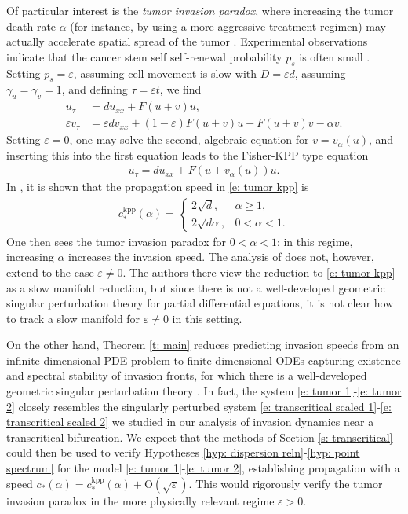 \documentclass[11pt]{article}
\newcommand{\eps}{\varepsilon}
\numberwithin{equation}{section}
\numberwithin{prop}{section}
\begin{document}
Of particular interest is the \emph{tumor invasion paradox}, where increasing the tumor death rate $\alpha$ (for instance, by using a more aggressive treatment regimen) may actually accelerate spatial spread of the tumor \cite{Tumor2}. Experimental observations indicate that the cancer stem self self-renewal probability $p_s$ is often small \cite{Tumor2}. Setting $p_s = \eps$, assuming cell movement is slow with $D = \eps d$, assuming $\gamma_u = \gamma_v = 1$, and defining $\tau = \eps t$, we find 
\begin{align}
u_\tau &= d u_{xx} + F(u+v) u, \label{e: tumor 1}\\
\eps v_\tau &= \eps d v_{xx} + (1-\eps) F(u+v) u + F(u+v) v - \alpha v. \label{e: tumor 2}
\end{align}
Setting $\eps = 0$, one may solve the second, algebraic equation for $v = v_\alpha (u)$, and inserting this into the first equation leads \cite{Tumor2} to the Fisher-KPP type equation
\begin{align}
u_\tau = d u_{xx} + F(u +v_\alpha(u)) u. \label{e: tumor kpp}
\end{align}
In \cite{Tumor1}, it is shown that the propagation speed in \eqref{e: tumor kpp} is
\begin{align}
	c_*^\mathrm{kpp} (\alpha) = \begin{cases}
	2 \sqrt{d}, &\alpha \geq 1, \\
	2 \sqrt{d \alpha}, & 0 < \alpha < 1.  
	\end{cases}	
\end{align}
One then sees the tumor invasion paradox for $0 < \alpha < 1$: in this regime, increasing $\alpha$ increases the invasion speed. The analysis of \cite{Tumor2} does not, however, extend to the case $\eps \neq 0$. The authors there view the reduction to \eqref{e: tumor kpp} as a slow manifold reduction, but since there is not a well-developed geometric singular perturbation theory for partial differential equations, it is not clear how to track a slow manifold for $\eps \neq 0 $ in this setting. 

On the other hand, Theorem \ref{t: main} reduces predicting invasion speeds from an infinite-dimensional PDE problem to finite dimensional ODEs capturing existence and spectral stability of invasion fronts, for which there is a well-developed geometric singular perturbation theory \cite{Fenichel}. In fact, the system \eqref{e: tumor 1}-\eqref{e: tumor 2} closely resembles the singularly perturbed system \eqref{e: transcritical scaled 1}-\eqref{e: transcritical scaled 2} we studied in our analysis of invasion dynamics near a transcritical bifurcation. We expect that the methods of Section \ref{s: transcritical} could then be used to verify Hypotheses \ref{hyp: dispersion reln}-\ref{hyp: point spectrum} for the model \eqref{e: tumor 1}-\eqref{e: tumor 2}, establishing propagation with a speed $c_*(\alpha) = c_*^\mathrm{kpp}(\alpha) + \mathrm{O}(\sqrt{\eps})$. This would rigorously verify the tumor invasion paradox in the more physically relevant regime $\eps > 0$.  
\end{document}
